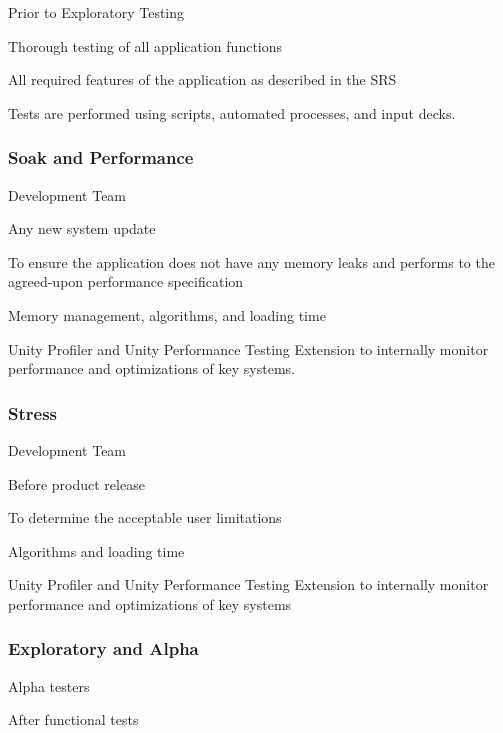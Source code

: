\documentclass[letterpaper,10pt,english,openany,oneside]{sphinxmanual}
\begin{document}
 Prior to Exploratory Testing

 Thorough testing of all application functions

 All required features of the application as described in the SRS

 Tests are performed using scripts, automated processes, and input decks.


\subsubsection{Soak and Performance}
\label{\detokenize{test_plan/strategy:soak-and-performance}}
 Development Team

 Any new system update

 To ensure the application does not have any memory leaks and performs to the agreed-upon performance specification

 Memory management, algorithms, and loading time

 Unity Profiler and Unity Performance Testing Extension to internally monitor performance and optimizations of key systems.


\subsubsection{Stress}
\label{\detokenize{test_plan/strategy:stress}}
 Development Team

 Before product release

 To determine the acceptable user limitations

 Algorithms and loading time

 Unity Profiler and Unity Performance Testing Extension to internally monitor performance and optimizations of key systems


\subsubsection{Exploratory and Alpha}
\label{\detokenize{test_plan/strategy:exploratory-and-alpha}}
 Alpha testers

 After functional tests
\end{document}
